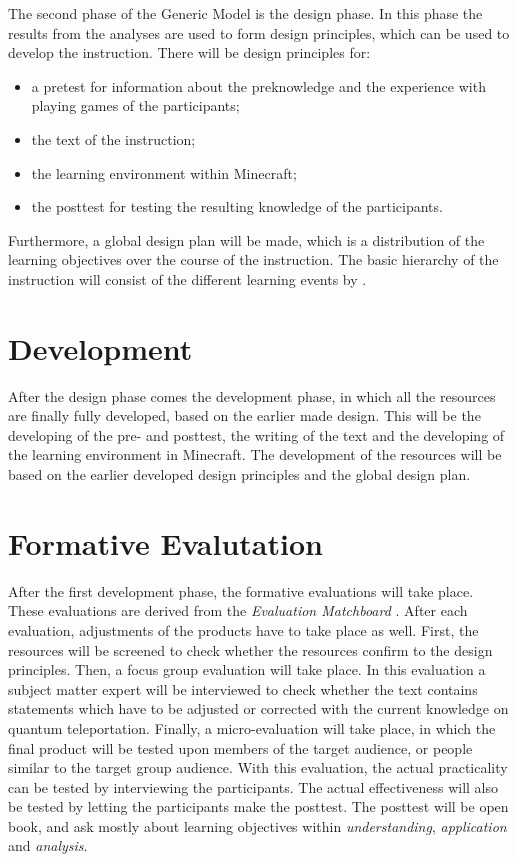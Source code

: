 \documentclass[12pt]{report} %
\begin{document}
The second phase of the Generic Model \cite{genericmodel} is the design phase. In this phase the results from the analyses are used to form design principles, which can be used to develop the instruction. There will be design principles for:
\begin{itemize}
\item a pretest for information about the preknowledge and the experience with playing games of the participants;
\item the text of the instruction;
\item the learning environment within Minecraft;
\item the posttest for testing the resulting knowledge of the participants.
\end{itemize}
Furthermore, a global design plan will be made, which is a distribution of the learning objectives over the course of the instruction. The basic hierarchy of the instruction will consist of the different learning events by .

\section{Development}

After the design phase comes the development phase, in which all the resources are finally fully developed, based on the earlier made design. This will be the developing of the pre- and posttest, the writing of the text and the developing of the learning environment in Minecraft. The development of the resources will be based on the earlier developed design principles and the global design plan.

\section{Formative Evalutation}

After the first development phase, the formative evaluations will take place. These evaluations are derived from the \emph{Evaluation Matchboard} \cite{evamatchboard}. After each evaluation, adjustments of the products have to take place as well. First, the resources will be screened to check whether the resources confirm to the design principles. Then, a focus group evaluation will take place. In this evaluation a subject matter expert will be interviewed to check whether the text contains statements which have to be adjusted or corrected with the current knowledge on quantum teleportation. Finally, a micro-evaluation will take place, in which the final product will be tested upon members of the target audience, or people similar to the target group audience. With this evaluation, the actual practicality can be tested by interviewing the participants. The actual effectiveness will also be tested by letting the participants make the posttest. The posttest will be open book, and ask mostly about learning objectives within \emph{understanding}, \emph{application} and \emph{analysis}.
\end{document}

